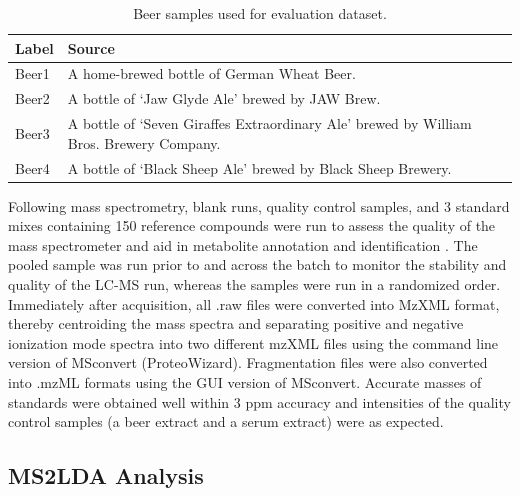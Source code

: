 \begin{table}[!htbp]
\small
\centering
\begin{tabular}{|l|l|}
\hline
\textbf{Label} & \textbf{Source}                                                                                                                                                                                        \\ \hline
Beer1          & A home-brewed bottle of German Wheat Beer. \\ \hline
Beer2          & A bottle of `Jaw Glyde Ale’ brewed by JAW Brew. \\ \hline
Beer3          & A bottle of `Seven Giraffes Extraordinary Ale’ brewed by William Bros. Brewery Company. \\ \hline
Beer4          & A bottle of `Black Sheep Ale’ brewed by Black Sheep Brewery. \\ \hline
\end{tabular}
\caption{Beer samples used for evaluation dataset.}
\label{tab:beer-sample-details}
\end{table}

Following mass spectrometry, blank runs, quality control samples, and 3 standard mixes containing 150 reference compounds were run to assess the quality of the mass spectrometer and aid in metabolite annotation and identification \cite{Creek2011}. The pooled sample was run prior to and across the batch to monitor the stability and quality of the LC-MS run, whereas the samples were run in a randomized order. Immediately after acquisition, all .raw files were converted into MzXML format, thereby centroiding the mass spectra and separating positive and negative ionization mode spectra into two different mzXML files using the command line version of MSconvert (ProteoWizard). Fragmentation files were also converted into .mzML formats using the GUI version of MSconvert.  Accurate masses of standards were obtained well within 3 ppm accuracy and intensities of the quality control samples (a beer extract and a serum extract) were as expected. 

\subsection{MS2LDA Analysis}

